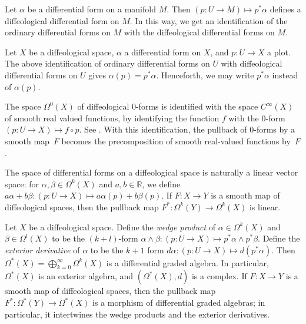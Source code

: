 \documentclass[pdftex]{sigma}
\numberwithin{equation}{section}
\newcommand{\RR}{{\mathbb{R}}} %
\newcommand{\CIN}{{C^\infty}} %
\begin{document}
\begin{Example} \label{e:forms-on-mflds}
Let $\alpha$ be a dif\/ferential form on a manifold $M$.
Then $(p \colon U \to M) \mapsto p^* \alpha$
def\/ines a dif\/feological dif\/ferential form on $M$.
In this way, we get an identif\/ication of the ordinary dif\/ferential forms
on $M$ with the dif\/feological dif\/ferential forms on $M$.

Let $X$ be a dif\/feological space, $\alpha$ a dif\/ferential form on $X$,
and $p \colon U \to X$ a plot.
The above identif\/ication of ordinary dif\/ferential forms on $U$
with dif\/feological dif\/ferential forms on $U$
gives $\alpha(p) = p^* \alpha$.
Henceforth, we may write $p^*\alpha$ instead of $\alpha(p)$.

\end{Example}

\begin{Example} \label{e:Omega0}
The space $\Omega^0(X)$ of dif\/feological $0$-forms
is identif\/ied with the space $\CIN(X)$
of smooth real valued functions,
by identifying the function $f$
with the $0$-form $(p \colon U \to X) \mapsto f \circ p$.
See \cite[Section~6.31]{iglesias}.
With this identif\/ication, the pullback of $0$-forms by a smooth map~$F$
becomes the precomposition of smooth real-valued functions by~$F$.
\end{Example}

\begin{Remark}\label{r:linear}
The space of dif\/ferential forms on a dif\/feological space is naturally
a linear vector space:
for $\alpha,\beta \in \Omega^k(X)$ and $a,b \in \RR$,
we def\/ine $a\alpha+b\beta \colon (p \colon U \to X) \mapsto
a \alpha(p) + b \beta(p)$.
If $F \colon X \to Y$ is a smooth map of dif\/feological spaces,
then the pullback map $F^*	 \colon \Omega^k(Y) \to \Omega^k(X)$ is linear.
\end{Remark}

\begin{Remark}
\label{alg iso}
Let $X$ be a dif\/feological space.
Def\/ine the \emph{wedge product}
of $ \alpha \in \Omega^k(X) $ and $ \beta \in \Omega^l(X) $
to be the $(k+l)$-form
$\alpha \wedge \beta \colon (p \colon U \to X)
 \mapsto p^* \alpha \wedge p^* \beta$.
Def\/ine the \emph{exterior derivative} of $\alpha$
to be the $k+1$ form
$d\alpha \colon (p \colon U \to X) \mapsto d (p^*\alpha)$.
Then $\Omega^*(X)=\bigoplus_{k=0}^\infty\Omega^k(X)$
is a dif\/ferential graded algebra.
In particular, $\Omega^*(X)$ is an exterior algebra,
and $(\Omega^*(X),d)$ is a complex.
If $F \colon X \to Y$ is a smooth map of dif\/feological spaces,
then the pullback map $F^* \colon \Omega^*(Y) \to \Omega^*(X)$
is a morphism of dif\/ferential graded algebras;
in particular,
it intertwines the wedge products and the exterior derivatives.
\end{Remark}
\end{document}
